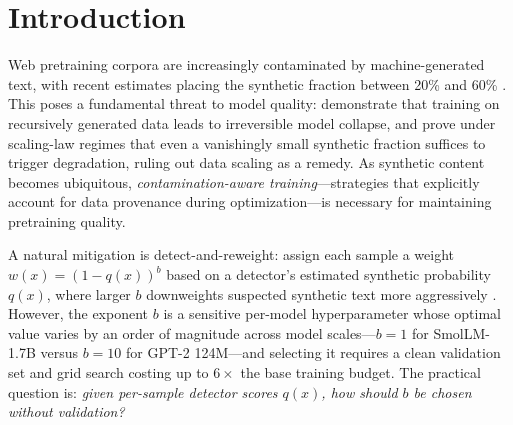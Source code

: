 
\section{Introduction}
\label{sec:intro}

Web pretraining corpora are increasingly contaminated by machine-generated text, with recent estimates placing the synthetic fraction between 20\% and 60\% \citep{cheng2025contamination}.
This poses a fundamental threat to model quality: \cite{shumailov2024model} demonstrate that training on recursively generated data leads to irreversible model collapse, and \cite{dohmatob2025strong} prove under scaling-law regimes that even a vanishingly small synthetic fraction suffices to trigger degradation, ruling out data scaling as a remedy.
As synthetic content becomes ubiquitous, \emph{contamination-aware training}---strategies that explicitly account for data provenance during optimization---is necessary for maintaining pretraining quality.

A natural mitigation is detect-and-reweight: assign each sample a weight $w(x) = (1 - q(x))^b$ based on a detector's estimated synthetic probability $q(x)$, where larger $b$ downweights suspected synthetic text more aggressively \citep{drayson2025detection}.
However, the exponent $b$ is a sensitive per-model hyperparameter whose optimal value varies by an order of magnitude across model scales---$b = 1$ for SmolLM-1.7B versus $b = 10$ for GPT-2 124M---and selecting it requires a clean validation set and grid search costing up to $6{\times}$ the base training budget.
The practical question is: \emph{given per-sample detector scores $q(x)$, how should $b$ be chosen without validation?}

